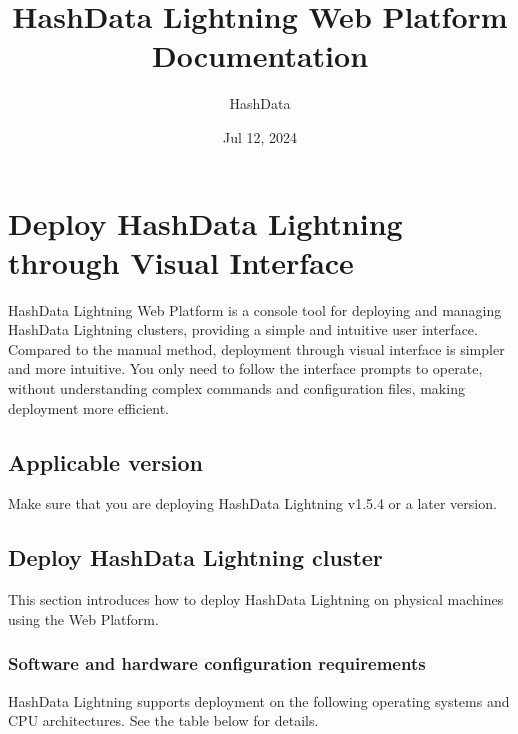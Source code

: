 \documentclass[letterpaper,10pt,english]{sphinxmanual}
\title{HashData Lightning Web Platform Documentation}
\date{Jul 12, 2024}
\author{HashData}
\begin{document}
\pagestyle{empty}
\sphinxmaketitle
\pagestyle{plain}
\sphinxtableofcontents
\pagestyle{normal}
\label{\detokenize{index::doc}}


\sphinxstepscope


\chapter{Deploy HashData Lightning through Visual Interface}
\label{\detokenize{deploy-guides/physical-deploy/visualized-deploy:deploy-hashdata-lightning-through-visual-interface}}\label{\detokenize{deploy-guides/physical-deploy/visualized-deploy::doc}}
\sphinxAtStartPar
HashData Lightning Web Platform is a console tool for deploying and managing HashData Lightning clusters, providing a simple and intuitive user interface. Compared to the manual method, deployment through visual interface is simpler and more intuitive. You only need to follow the interface prompts to operate, without understanding complex commands and configuration files, making deployment more efficient.


\section{Applicable version}
\label{\detokenize{deploy-guides/physical-deploy/visualized-deploy:applicable-version}}
\sphinxAtStartPar
Make sure that you are deploying HashData Lightning v1.5.4 or a later version.


\section{Deploy HashData Lightning cluster}
\label{\detokenize{deploy-guides/physical-deploy/visualized-deploy:deploy-hashdata-lightning-cluster}}
\sphinxAtStartPar
This section introduces how to deploy HashData Lightning on physical machines using the Web Platform.


\subsection{Software and hardware configuration requirements}
\label{\detokenize{deploy-guides/physical-deploy/visualized-deploy:software-and-hardware-configuration-requirements}}
\sphinxAtStartPar
HashData Lightning supports deployment on the following operating systems and CPU architectures. See the table below for details.
\end{document}
